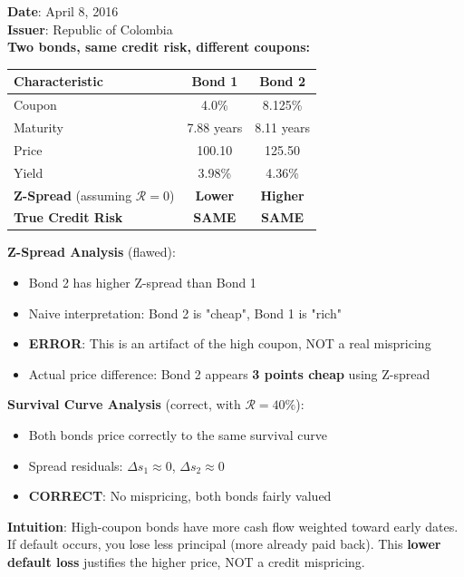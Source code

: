 \documentclass[11pt,a4paper]{article}
\begin{document}
\begin{examplebox}
\textbf{Date}: April 8, 2016\\
\textbf{Issuer}: Republic of Colombia\\
\textbf{Two bonds, same credit risk, different coupons:}

\begin{table}[h]
\centering
\begin{tabular}{lcc}
\toprule
\textbf{Characteristic} & \textbf{Bond 1} & \textbf{Bond 2} \\
\midrule
Coupon & 4.0\% & 8.125\% \\
Maturity & 7.88 years & 8.11 years \\
Price & 100.10 & 125.50 \\
Yield & 3.98\% & 4.36\% \\
\midrule
\textbf{Z-Spread} (assuming $\mathcal{R}=0$) & \textbf{Lower} & \textbf{Higher} \\
\textbf{True Credit Risk} & \textbf{SAME} & \textbf{SAME} \\
\bottomrule
\end{tabular}
\end{table}

\textbf{Z-Spread Analysis} (flawed):
\begin{itemize}
    \item Bond 2 has higher Z-spread than Bond 1
    \item Naive interpretation: Bond 2 is "cheap", Bond 1 is "rich"
    \item \textcolor{warning}{\textbf{ERROR}}: This is an artifact of the high coupon, NOT a real mispricing
    \item Actual price difference: Bond 2 appears \textbf{3 points cheap} using Z-spread
\end{itemize}

\textbf{Survival Curve Analysis} (correct, with $\mathcal{R}=40\%$):
\begin{itemize}
    \item Both bonds price correctly to the same survival curve
    \item Spread residuals: $\Delta s_1 \approx 0$, $\Delta s_2 \approx 0$
    \item \textcolor{implementation}{\textbf{CORRECT}}: No mispricing, both bonds fairly valued
\end{itemize}

\textbf{Intuition}: High-coupon bonds have more cash flow weighted toward early dates. If default occurs, you lose less principal (more already paid back). This \textbf{lower default loss} justifies the higher price, NOT a credit mispricing.
\end{examplebox}
\end{document}
